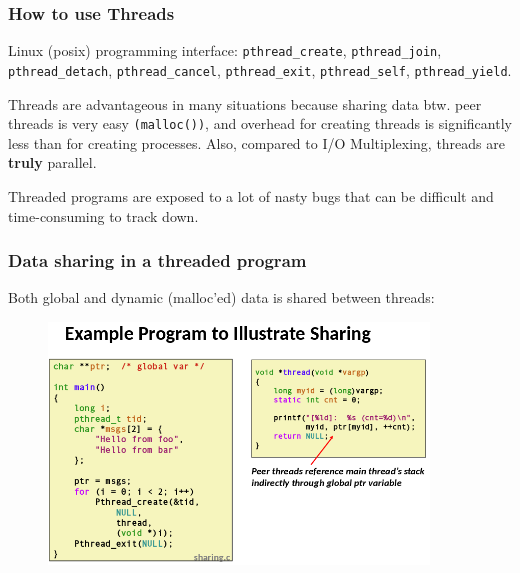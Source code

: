 \documentclass[xcolor={usenames,dvipsnames}]{beamer}
\begin{document}
%
%
%
\begin{frame}
\frametitle{How to use Threads}

Linux (posix) programming interface: \texttt{pthread\_create}, \texttt{pthread\_join},
\texttt{pthread\_detach}, \texttt{pthread\_cancel}, \texttt{pthread\_exit},
\texttt{pthread\_self}, \texttt{pthread\_yield}.\\\vspace{3mm}

Threads are advantageous in many situations because sharing data btw. peer threads
is very easy \texttt{(malloc())}, and overhead for creating threads is significantly
less than for creating processes. Also, compared to I/O Multiplexing, threads are
\textbf{truly} parallel.\\\vspace{3mm}

Threaded programs are exposed to a lot of nasty bugs that can be difficult and
time-consuming to track down.

\end{frame}



%
%
%
\begin{frame}
\frametitle{Data sharing in a threaded program}
Both global and dynamic (malloc'ed) data is shared between threads:

\begin{figure}
\includegraphics[width=0.9\textwidth]{images/example-program-to-illustrate-sharing.png}
\end{figure}
\end{frame}
\end{document}
